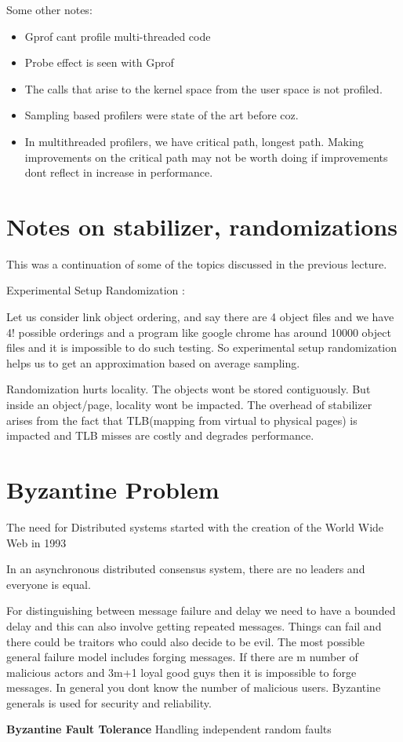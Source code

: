 \documentclass[twoside]{article}
\begin{document}
Some other notes: 
\begin{itemize}
    \item Gprof cant profile multi-threaded code
    \item Probe effect is seen with Gprof
    \item The calls that arise to the kernel space from the user space is not profiled.
    \item Sampling based profilers were state of the art before coz.
    \item In multithreaded profilers, we have critical path, longest path. Making improvements on the critical path may not be worth doing if improvements dont reflect in increase in performance.
    
    
\end{itemize}





\section*{Notes on stabilizer, randomizations}
This was a continuation of some of the topics discussed in the previous lecture.

Experimental Setup Randomization :

Let us consider link object ordering, and say there are 4 object files and we have 4! possible orderings and a program like google chrome has around 10000 object files and it is impossible to do such testing. So experimental setup randomization helps us to get an approximation based on average sampling. 

Randomization hurts locality. The objects wont be stored contiguously. But inside an object/page, locality wont be impacted. The overhead of stabilizer arises from the fact that TLB(mapping from virtual to physical pages) is impacted and TLB misses are costly and degrades performance.

\section*{Byzantine Problem}
The need for Distributed systems started with the creation of the World Wide Web in 1993

In an asynchronous distributed consensus system, there are no leaders and everyone is equal.

For distinguishing between message failure and delay we need to have a bounded delay and this can also involve getting repeated messages. Things can fail and there could be traitors who could also decide to be evil. The most possible general failure model includes forging messages. If there are m number of malicious actors and 3m+1 loyal good guys then it is impossible to forge messages. In general you dont know the number of malicious users.
Byzantine generals is used for security and reliability.



\textbf{Byzantine Fault Tolerance}
Handling independent random faults
\end{document}
